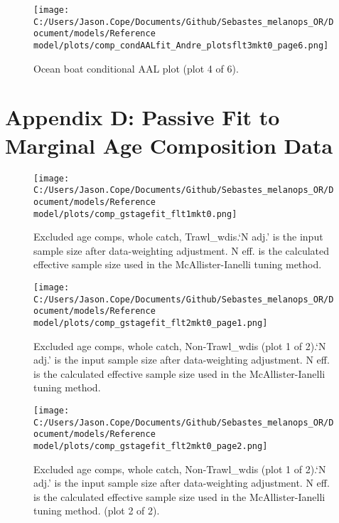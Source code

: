 \documentclass[11pt,
  english,
  letterpaper,
]{article}
\begin{document}
\begin{figure}
\centering
\texttt{[image: C:/Users/Jason.Cope/Documents/Github/Sebastes\_melanops\_OR/Document/models/Reference model/plots/comp\_condAALfit\_Andre\_plotsflt3mkt0\_page6.png]}
\caption{Ocean boat conditional AAL plot (plot 4 of 6).\label{fig:comp_condAALfit_Andre_plotsflt3mkt0_page6}}
\end{figure}

\clearpage

\hypertarget{app-d}{%
\section{Appendix D: Passive Fit to Marginal Age Composition Data}\label{app-d}}

\begin{figure}
\centering
\texttt{[image: C:/Users/Jason.Cope/Documents/Github/Sebastes\_melanops\_OR/Document/models/Reference model/plots/comp\_gstagefit\_flt1mkt0.png]}
\caption{Excluded age comps, whole catch, Trawl\_wdis.`N adj.' is the input sample size after data-weighting adjustment. N eff. is the calculated effective sample size used in the McAllister-Ianelli tuning method.\label{fig:comp_gstagefit_flt1mkt0}}
\end{figure}

\begin{figure}
\centering
\texttt{[image: C:/Users/Jason.Cope/Documents/Github/Sebastes\_melanops\_OR/Document/models/Reference model/plots/comp\_gstagefit\_flt2mkt0\_page1.png]}
\caption{Excluded age comps, whole catch, Non-Trawl\_wdis (plot 1 of 2).`N adj.' is the input sample size after data-weighting adjustment. N eff. is the calculated effective sample size used in the McAllister-Ianelli tuning method.\label{fig:comp_gstagefit_flt2mkt0_page1}}
\end{figure}

\begin{figure}
\centering
\texttt{[image: C:/Users/Jason.Cope/Documents/Github/Sebastes\_melanops\_OR/Document/models/Reference model/plots/comp\_gstagefit\_flt2mkt0\_page2.png]}
\caption{Excluded age comps, whole catch, Non-Trawl\_wdis (plot 1 of 2).`N adj.' is the input sample size after data-weighting adjustment. N eff. is the calculated effective sample size used in the McAllister-Ianelli tuning method. (plot 2 of 2).\label{fig:comp_gstagefit_flt2mkt0_page2}}
\end{figure}
\end{document}
